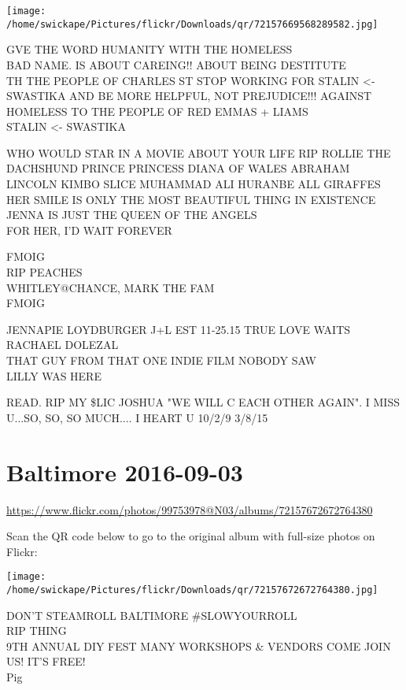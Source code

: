 \documentclass[10pt,letterpaper]{article}
\begin{document}
\texttt{[image: /home/swickape/Pictures/flickr/Downloads/qr/72157669568289582.jpg]}


GVE THE WORD HUMANITY WITH THE HOMELESS\\
BAD NAME.  IS ABOUT CAREING!! ABOUT BEING DESTITUTE\\
TH THE PEOPLE OF CHARLES ST STOP WORKING FOR STALIN <{-} SWASTIKA AND BE MORE HELPFUL, NOT PREJUDICE!!! AGAINST HOMELESS TO THE PEOPLE OF RED EMMAS + LIAMS\\
STALIN <{-} SWASTIKA

WHO WOULD STAR IN A MOVIE ABOUT YOUR LIFE RIP ROLLIE THE DACHSHUND PRINCE PRINCESS DIANA OF WALES ABRAHAM LINCOLN KIMBO SLICE MUHAMMAD ALI HURANBE ALL GIRAFFES\\
HER SMILE IS ONLY THE MOST BEAUTIFUL THING IN  EXISTENCE\\
JENNA IS JUST THE QUEEN OF THE ANGELS\\
FOR HER, I'D WAIT FOREVER

FMOIG\\
RIP PEACHES\\
WHITLEY@CHANCE, MARK THE FAM\\
FMOIG

JENNAPIE LOYDBURGER J+L EST 11{-}25.15 TRUE LOVE WAITS\\
RACHAEL DOLEZAL\\
THAT GUY FROM THAT ONE INDIE FILM NOBODY SAW\\
LILLY WAS HERE

READ.  RIP MY \$LIC JOSHUA "WE WILL C EACH OTHER AGAIN".  I MISS U...SO, SO, SO MUCH.... I HEART U 10/2/9 3/8/15


\section*{Baltimore 2016-09-03}

\url{https://www.flickr.com/photos/99753978@N03/albums/72157672672764380}

Scan the QR code below to go to the original album with full-size photos on Flickr:

\texttt{[image: /home/swickape/Pictures/flickr/Downloads/qr/72157672672764380.jpg]}


DON'T STEAMROLL BALTIMORE \#SLOWYOURROLL\\
RIP THING\\
9TH ANNUAL DIY FEST MANY WORKSHOPS \& VENDORS COME JOIN US!  IT'S FREE!\\
Pig
\end{document}
